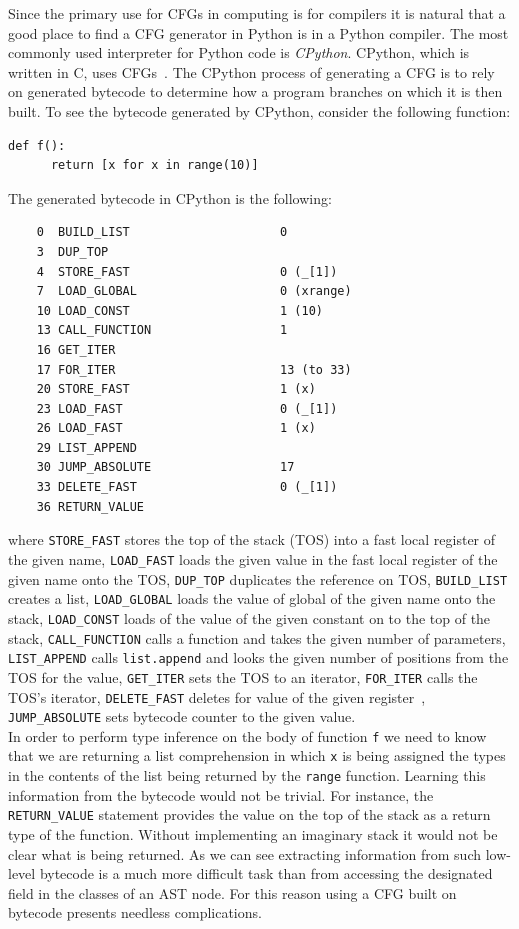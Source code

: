 \documentclass[12pt, titlepage]{article}
\begin{document}
Since the primary use for CFGs in computing is for compilers it is natural that a good place to find a CFG generator in Python is in a Python compiler. The most commonly used interpreter for Python code is \textit{CPython}. CPython, which is written in C, uses CFGs~\cite{cpythonCFG}. The CPython process of generating a CFG is to rely on generated bytecode to determine how a program branches on which it is then built. To see the bytecode generated by CPython, consider the following function:
\begin{lstlisting}[mathescape]
    def f():
      return [x for x in range(10)]
\end{lstlisting} 
The generated bytecode in CPython is the following:~\cite{cpythonBytecode}
\begin{verbatim}
    0  BUILD_LIST                     0
    3  DUP_TOP
    4  STORE_FAST                     0 (_[1])
    7  LOAD_GLOBAL                    0 (xrange)
    10 LOAD_CONST                     1 (10)
    13 CALL_FUNCTION                  1
    16 GET_ITER
    17 FOR_ITER                       13 (to 33)
    20 STORE_FAST                     1 (x)
    23 LOAD_FAST                      0 (_[1])
    26 LOAD_FAST                      1 (x)
    29 LIST_APPEND
    30 JUMP_ABSOLUTE                  17
    33 DELETE_FAST                    0 (_[1])
    36 RETURN_VALUE
\end{verbatim}
where \texttt{STORE\_FAST} stores the top of the stack (TOS) into a fast local register of the given name, \texttt{LOAD\_FAST} loads the given value in the fast local register of the given name onto the TOS, \texttt{DUP\_TOP} duplicates the reference on TOS, \texttt{BUILD\_LIST} creates a list, \texttt{LOAD\_GLOBAL} loads the value of global of the given name onto the stack, \texttt{LOAD\_CONST} loads of the value of the given constant on to the top of the stack, \texttt{CALL\_FUNCTION} calls a function and takes the given number of parameters, \texttt{LIST\_APPEND} calls \texttt{list.append} and looks the given number of positions from the TOS for the value, \texttt{GET\_ITER} sets the TOS to an iterator, \texttt{FOR\_ITER} calls the TOS's iterator, \texttt{DELETE\_FAST} deletes for value of the given register~\cite{disBytecode}, \texttt{JUMP\_ABSOLUTE} sets bytecode counter to the given value. \\
\indent In order to perform type inference on the body of function \texttt{f} we need to know that we are returning a list comprehension in which \texttt{x} is being assigned the types in the contents of the list being returned by the \texttt{range} function. Learning this information from the bytecode would not be trivial. For instance, the \texttt{RETURN\_VALUE} statement provides the value on the top of the stack as a return type of the function. Without implementing an imaginary stack it would not be clear what is being returned. As we can see extracting information from such low-level bytecode is a much more difficult task than from accessing the designated field in the classes of an AST node. For this reason using a CFG built on bytecode presents needless complications. \\
\end{document}
